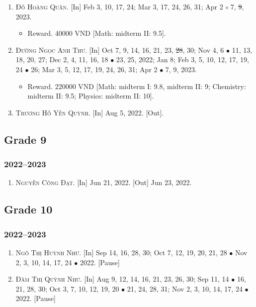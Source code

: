 \documentclass{article}
\begin{document}
\begin{enumerate}
	\item \textsc{Đỗ Hoàng Quân.} \textsf{[In]} Feb 3, 10, 17, 24; Mar 3, 17, 24, 26, 31; Apr 2 $\circ$ 7, \st{9}, 2023.
	\begin{itemize}
		\item \textsf{Reward.} 40000 VND [Math: midterm II: 9.5].
	\end{itemize}
	\item \textsc{Đường Ngọc Anh Thư.} \textsf{[In]} Oct 7, 9, 14, 16, 21, 23, \st{28}, 30; Nov 4, 6 $\bullet$ 11, 13, 18, 20, 27; Dec 2, 4, 11, 16, 18 $\bullet$ 23, 25, 2022; Jan 8; Feb 3, 5, 10, 12, 17, 19, 24 $\bullet$ 26; Mar 3, 5, 12, 17, 19, 24, 26, 31; Apr 2 $\bullet$ 7, 9, 2023.
	\begin{itemize}
		\item \textsf{Reward.} 220000 VND [Math: midterm I: 9.8, midterm II: 9; Chemistry: midterm II: 9.5; Physics: midterm II: 10].
	\end{itemize}
	\item \textsc{Trương Hồ Yến Quỳnh.} \textsf{[In]} Aug 5, 2022. \textsf{[Out]}.
\end{enumerate}

\subsection{Grade 9}

\subsubsection{2022--2023}

\begin{enumerate}
	\item \textsc{Nguyễn Công Đạt.} \textsf{[In]} Jun 21, 2022. \textsf{[Out]} Jun 23, 2022.
\end{enumerate}

\subsection{Grade 10}

\subsubsection{2022--2023}

\begin{enumerate}
	\item \textsc{Ngô Thị Huỳnh Như.} \textsf{[In]} Sep 14, 16, 28, 30; Oct 7, 12, 19, 20, 21, 28 $\bullet$ Nov 2, 3, 10, 14, 17, 24 $\bullet$ 2022. \textsf{[Pause]}
	\item \textsc{Đàm Thị Quỳnh Như.} \textsf{[In]} Aug 9, 12, 14, 16, 21, 23, 26, 30; Sep 11, 14 $\bullet$ 16, 21, 28, 30; Oct 3, 7, 10, 12, 19, 20 $\bullet$ 21, 24, 28, 31; Nov 2, 3, 10, 14, 17, 24 $\bullet$ 2022. \textsf{[Pause]}
\end{enumerate}
\end{document}
